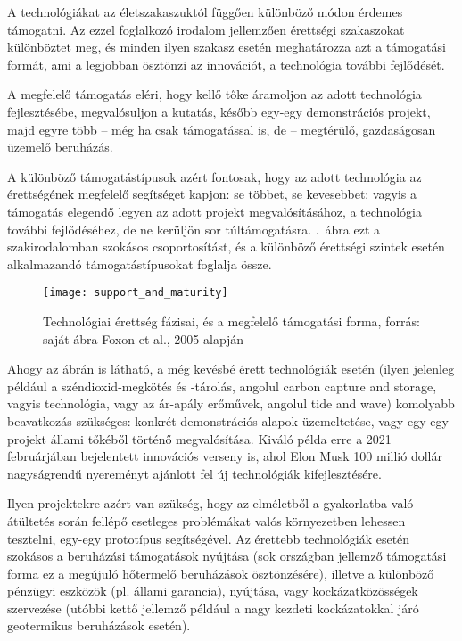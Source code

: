 \documentclass[twoside, magyar, showtrims]{corvinusphd}
\theoremstyle{plain}
\theoremstyle{remark}
\theoremstyle{definition}
\begin{document}
A technológiákat az életszakaszuktól függően különböző
módon érdemes támogatni. Az ezzel foglalkozó irodalom
jellemzően érettségi szakaszokat különböztet meg, 
és minden ilyen szakasz esetén meghatározza azt a támogatási
formát, ami a legjobban ösztönzi az innovációt, a technológia 
további fejlődését.

A megfelelő támogatás eléri, hogy kellő tőke áramoljon
az adott technológia fejlesztésébe, megvalósuljon a kutatás,
később egy-egy demonstrációs projekt, majd egyre több
-- még ha csak támogatással is, de -- megtérülő, gazdaságosan
üzemelő beruházás. 

A különböző támogatástípusok azért 
fontosak, hogy az adott technológia az érettségének megfelelő
segítséget kapjon: se többet, se kevesebbet; vagyis a támogatás
elegendő legyen az adott projekt megvalósításához, a technológia
további fejlődéséhez, de ne kerüljön sor túltámogatásra.
.~ábra ezt a szakirodalomban
szokásos csoportosítást, és a különböző érettségi szintek esetén
alkalmazandó támogatástípusokat foglalja össze.

\begin{figure}
    \centering
    \texttt{[image: support\_and\_maturity]}
    \caption{Technológiai érettség fázisai, és a megfelelő támogatási forma, forrás: saját ábra Foxon et al., 2005 alapján}
    \label{fig:support_and_maturity}
\end{figure}

Ahogy az ábrán is látható, a még kevésbé érett technológiák esetén
(ilyen jelenleg például a széndioxid-megkötés és -tárolás, angolul
carbon capture and storage, vagyis  technológia,
vagy az ár-apály erőművek, 
angolul tide and wave) komolyabb beavatkozás szükséges: konkrét
demonstrációs alapok üzemeltetése, vagy egy-egy projekt állami tőkéből
történő megvalósítása. Kiváló példa erre a 2021 februárjában
bejelentett innovációs verseny is, ahol Elon Musk
100 millió dollár nagyságrendű nyereményt
ajánlott fel új  technológiák kifejlesztésére.

Ilyen projektekre azért van szükség, hogy az elméletből
a gyakorlatba való átültetés során fellépő esetleges problémákat
valós környezetben lehessen tesztelni, egy-egy prototípus segítségével.
Az érettebb technológiák esetén szokásos a beruházási támogatások nyújtása
(sok országban jellemző támogatási forma ez a megújuló hőtermelő
beruházások ösztönzésére), illetve a különböző
pénzügyi eszközök (pl. állami garancia), 
nyújtása, vagy kockázatközösségek szervezése
(utóbbi kettő jellemző például a nagy kezdeti
kockázatokkal járó geotermikus beruházások esetén).
\end{document}
